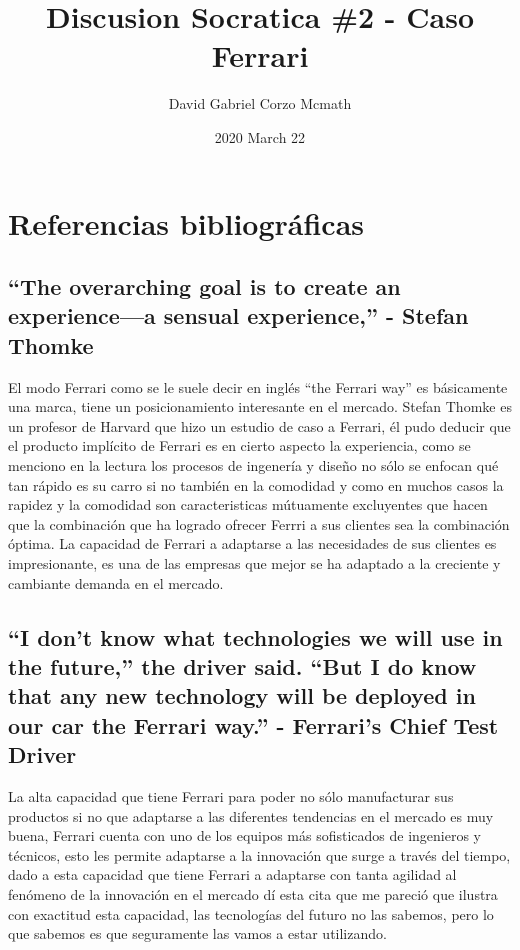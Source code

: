 \documentclass{article}
\title{Discusion Socratica \#2 - Caso Ferrari}
\date{2020 March 22}
\author{David Gabriel Corzo Mcmath}
\begin{document}
\maketitle


\section{Referencias bibliográficas}
\subsection{``The overarching goal is to create an experience—a sensual experience,'' - Stefan Thomke}
El modo Ferrari como se le suele decir en inglés ``the Ferrari way'' es básicamente una marca, tiene un posicionamiento interesante en el mercado. Stefan Thomke es un profesor de Harvard que hizo un estudio de caso a Ferrari, él pudo deducir que el producto implícito de Ferrari es en cierto aspecto la experiencia, como se menciono en la lectura los procesos de ingenería y diseño no sólo se enfocan qué tan rápido es su carro si no también en la comodidad y como en muchos casos la rapidez y la comodidad son caracteristicas mútuamente excluyentes que hacen que la combinación que ha logrado ofrecer Ferrri a sus clientes sea la combinación óptima. La capacidad de Ferrari a adaptarse a las necesidades de sus clientes es impresionante, es una de las empresas que mejor se ha adaptado a la creciente y cambiante demanda en el mercado. 



\subsection{``I don’t know what technologies we will use in the future,” the driver said. “But I do know that any new technology will be deployed in our car the Ferrari way.'' - Ferrari's Chief Test Driver}
La alta capacidad que tiene Ferrari para poder no sólo manufacturar sus productos si no que adaptarse a las diferentes tendencias en el mercado es muy buena, Ferrari cuenta con uno de los equipos más sofisticados de ingenieros y técnicos, esto les permite adaptarse a la innovación que surge a través del tiempo, dado a esta capacidad que tiene Ferrari a adaptarse con tanta agilidad al fenómeno de la innovación en el mercado dí esta cita que me pareció que ilustra con exactitud esta capacidad, las tecnologías del futuro no las sabemos, pero lo que sabemos es que seguramente las vamos a estar utilizando. 
\end{document}

